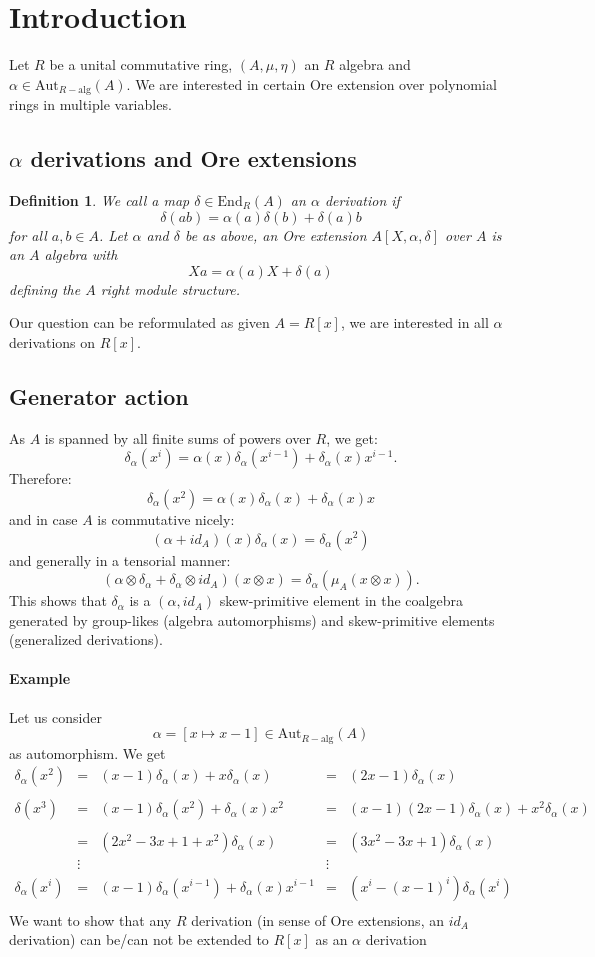 \documentclass[10pt,a4paper]{article}
\author{moi}
\newtheorem{defi}{Definition}
\begin{document}
\section{Introduction}
Let $R$ be a unital commutative ring, $(A,\mu,\eta)$ an $R$ algebra and $\alpha \in \mathrm{Aut}_{R-\mathrm{alg}}(A)$. We are interested in certain Ore extension over polynomial rings in multiple variables.
\subsection{$\alpha$ derivations and Ore extensions}
\begin{defi}
We call a map $\delta \in \mathrm{End}_R(A)$ an $\alpha$ derivation if
$$\delta(a b) = \alpha(a) \delta(b) + \delta(a) b$$
for all $a, b \in A$. Let $\alpha$ and $\delta$ be as above, an Ore extension $A[X,\alpha,\delta]$ over $A$ is an $A$ algebra with
$$X a = \alpha(a) X + \delta(a)$$
defining the $A$ right module structure.
\end{defi}
Our question can be reformulated as given $A = R[x]$, we are interested in all $\alpha$ derivations on $R[x]$.
\subsection{Generator action}
As $A$ is spanned by all finite sums of powers over $R$, we get:
$$\delta_\alpha(x^i) = \alpha(x) \delta_\alpha(x^{i-1}) + \delta_\alpha(x) x^{i-1}.$$
Therefore:
$$\delta_\alpha(x^2) = \alpha(x) \delta_\alpha(x) + \delta_\alpha(x) x$$
and in case $A$ is commutative nicely:
$$(\alpha + id_A)(x) \delta_\alpha(x) = \delta_\alpha(x^2)$$
and generally in a tensorial manner:
$$(\alpha \otimes \delta_\alpha + \delta_\alpha \otimes id_A) (x \otimes x) = \delta_\alpha(\mu_A(x \otimes x)).$$
This shows that $\delta_\alpha$ is a $(\alpha,id_A)$ skew-primitive element in the coalgebra generated by group-likes (algebra automorphisms) and skew-primitive elements (generalized derivations).
\paragraph{Example} Let us consider
$$\alpha = [x \longmapsto x - 1] \in \mathrm{Aut}_{R-\mathrm{alg}}(A)$$
as automorphism. We get
$$\begin{array}{rclcl}
\delta_\alpha(x^2) &=& (x - 1) \delta_\alpha(x) + x \delta_\alpha(x) &=& (2 x - 1) \delta_\alpha(x)\\
&&&&\\
\delta(x^3) &=& (x - 1) \delta_\alpha(x^2) + \delta_\alpha(x) x^2 &=& (x - 1)(2 x - 1) \delta_\alpha(x) + x^2 \delta_\alpha(x)\\
&&&&\\
&=& (2 x^2 - 3 x + 1 + x^2) \delta_\alpha(x) &=& (3 x^2 - 3 x + 1) \delta_\alpha(x)\\
&\vdots&&\vdots&\\
\delta_\alpha(x^i) &=& (x - 1) \delta_\alpha(x^{i-1}) + \delta_\alpha(x) x^{i-1} &=& (x^i - (x - 1)^i) \delta_\alpha(x^i)\\ 
\end{array}$$
We want to show that any $R$ derivation (in sense of Ore extensions, an $id_A$ derivation) can be/can not be extended to $R[x]$ as an $\alpha$ derivation
\end{document}

